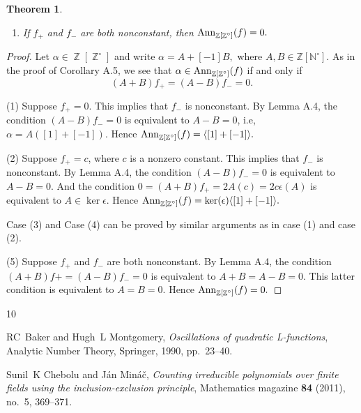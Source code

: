 \documentclass[12t,a4paper]{amsart}
\newtheorem{thm}{Theorem}[section]
\theoremstyle{definition}
\DeclareMathOperator{\Z}{\mathbb{Z}}
\newcommand{\Ann}{{\rm Ann}}
\numberwithin{equation}{section}
\begin{document}
{\begin{thm}
\begin{enumerate}
    \item If $f_+$ and $f_-$ are both nonconstant, then     \(    \Ann_{\Z[\Z^\circ]}(f)=0.    \)
\end{enumerate}
\end{thm}

\begin{proof}
    Let $\alpha\in \Z [\Z^\circ]$ and write \(\alpha=A+[-1]B,\) where \(A,B\in \mathbb Z[\mathbb N^\circ]\). As in the proof of Corollary A.5, we see that 
    $\alpha \in \Ann_{\Z[\Z^\circ]}(f) $ if and only if
    \[
    (A+B)f_+=(A-B)f_- =0.
    \]

    (1) Suppose $f_+=0$. This implies that $f_-$ is nonconstant. By Lemma A.4,  the condition $(A-B)f_-=0$ is equivalent to $A-B=0$, i.e, $\alpha=A([1]+[-1])$. Hence \( \Ann_{\Z[\Z^\circ]}(f)=\langle [1]+[-1]\rangle.  \)

    (2) Suppose $f_+=c$, where $c$ is a nonzero constant. This implies that $f_-$ is nonconstant. By Lemma A.4,  the condition $(A-B)f_-=0$ is equivalent to $A-B=0$. And the condition $0=(A+B)f_+=2A(c)=2c\epsilon(A)$ is equivalent to $A\in \ker\epsilon$. Hence \( \Ann_{\Z[\Z^\circ]}(f)=\ker(\epsilon)\langle [1]+[-1]\rangle.  \)
    
    Case (3) and Case (4) can be proved by similar arguments as in case (1) and case (2).

    (5) Suppose $f_+$ and $f_-$ are both nonconstant.  By Lemma A.4,  the condition $(A+B)f+=(A-B)f_- = 0$ is equivalent to $A+B=A-B=0$. This latter condition is equivalent to $A=B=0$. Hence   \(    \Ann_{\Z[\Z^\circ]}(f)=0.    \)
    
\end{proof}




%


%
\begin{thebibliography}{10}

RC~Baker and Hugh~L Montgomery, \emph{Oscillations of quadratic {L}-functions}, Analytic Number Theory, Springer, 1990, pp.~23--40.

Sunil~K Chebolu and J{\'a}n Min{\'a}{\v{c}}, \emph{Counting irreducible polynomials over finite fields using the inclusion-exclusion principle}, Mathematics magazine \textbf{84} (2011), no.~5, 369--371.


\end{thebibliography}}
\end{document}

